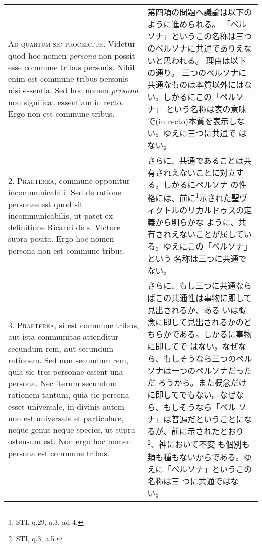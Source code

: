 \documentclass[10pt]{jsarticle} %
\begin{document}
\begin{longtable}{p{21em}p{21em}}

{\scshape Ad quartum sic proceditur}. Videtur quod hoc nomen {\itshape persona} non possit
esse commune tribus personis. Nihil enim est commune tribus personis
nisi essentia. Sed hoc nomen {\itshape persona} non significat essentiam in
recto. Ergo non est commune tribus.

&

第四項の問題へ議論は以下のように進められる。
「ペルソナ」というこの名称は三つのペルソナに共通でありえないと思われる。
 理由は以下の通り。
三つのペルソナに共通なものは本質以外にはない。しかるにこの「ペルソナ」
 という名称は表の意味で(in recto)本質を表示しない。ゆえに三つに共通で
 はない。

\\



2. {\scshape Praeterea}, commune opponitur incommunicabili. Sed de ratione personae
est quod sit incommunicabilis, ut patet ex definitione Ricardi de
s. Victore supra posita. Ergo hoc nomen persona non est commune
tribus.

&

さらに、共通であることは共有されえないことに対立する。しかるにペルソナ
 の性格には、前に\footnote{STI, q.29, a.3, ad 4.}示された聖ヴィクトルのリカルドゥスの定義から明らかな
 ように、共有されえないことが属している。ゆえにこの「ペルソナ」という
 名称は三つに共通でない。


\\



3. {\scshape Praeterea}, si est commune tribus, aut ista communitas attenditur
secundum rem, aut secundum rationem. Sed non secundum rem, quia sic
tres personae essent una persona. Nec iterum secundum rationem tantum,
quia sic persona esset universale, in divinis autem non est universale
et particulare, neque genus neque species, ut supra ostensum est. Non
ergo hoc nomen persona est commune tribus.

&

さらに、もし三つに共通ならばこの共通性は事物に即して見出されるか、ある
 いは概念に即して見出されるかのどちらかである。しかるに事物に即してで
 はない。なぜなら、もしそうなら三つのペルソナは一つのペルソナだっただ
 ろうから。また概念だけに即してでもない。なぜなら、もしそうなら「ペル
 ソナ」は普遍だということになるが、前に示されたとおり\footnote{STI,
 q.3, a.5.}、神において不変
 も個別も類も種もないからである。ゆえに「ペルソナ」というこの名称は三
 つに共通ではない。


\end{longtable}
\end{document}
